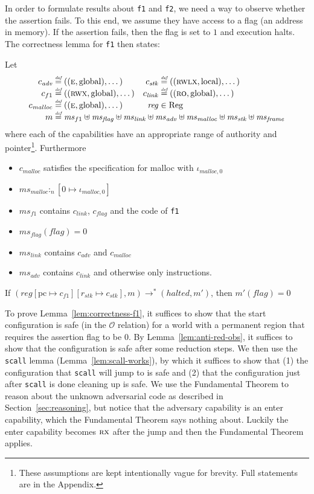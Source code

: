 \documentclass[format=acmsmall, review=true, screen=true]{acmart}
\renewcommand{\sectionname}{Section}
\newcommand{\update}[2]{[#1 \mapsto #2]}
\newcommand{\defeq}{\stackrel{\textit{\tiny{def}}}{=}}
\newcommand{\var}[1]{\mathit{#1}}
\newcommand{\hs}{\var{ms}}
\newcommand{\ms}{\hs}
\newcommand{\pcreg}{\mathrm{pc}}
\newcommand{\reg}{\var{reg}}
\newcommand{\heap}{\var{mem}}
\newcommand{\adv}{\var{adv}}
\newcommand{\link}{\var{link}}
\newcommand{\stk}{\var{stk}}
\newcommand{\flag}{\var{flag}}
\newcommand{\halted}{\mathit{halted}}
\newcommand{\heapSat}[3][\heap]{#1 :_{#2} #3}
\newcommand{\codelabel}[1]{\mathit{#1}}
\newcommand{\malloc}{\codelabel{malloc}}
\newcommand{\plaindom}[1]{\mathrm{#1}}
\newcommand{\Regs}{\plaindom{Reg}}
\newcommand{\observations}{\mathcal{O}}
\newcommand{\plainperm}[1]{\textsc{#1}}
\newcommand{\readonly}{\plainperm{ro}}
\newcommand{\exec}{\plainperm{rx}}
\newcommand{\entry}{\plainperm{e}}
\newcommand{\rwx}{\plainperm{rwx}}
\newcommand{\rwlx}{\plainperm{rwlx}}
\newcommand{\plainlocality}[1]{\mathrm{#1}}
\newcommand{\local}{\plainlocality{local}}
\newcommand{\glob}{\plainlocality{global}}
\newcommand{\step}[1][]{\rightarrow_{#1}}
\begin{document}
In order to formulate results about \texttt{f1} and
\texttt{f2}, we need a way to observe whether the assertion
fails. To this end, we assume they have access to a flag (an address in memory).
If the assertion fails, then the flag is set to $1$ and execution halts. The correctness lemma
for \texttt{f1} then states:
\begin{lemma}
  \label{lem:correctness-f1}
  Let
\[
    \begin{array}{r@{}lr@{}l}
    c_\adv & \;\defeq ((\entry,\glob),\dots) & c_{\var{stk}} & \;\defeq ((\rwlx,\local),\dots)\\
    c_{f1} & \;\defeq ((\rwx,\glob),\dots) & c_\link &\; \defeq ((\readonly,\glob),\dots)\\
    c_\malloc &\; \defeq ((\entry,\glob),\dots) & \reg& \; \in \Regs \\
    m &  \multicolumn{3}{@{}l}{\;\defeq \ms_{f1} \uplus \ms_\flag \uplus \ms_{\var{link}} \uplus \hs_\adv \uplus \ms_{\malloc} \uplus \ms_{\var{stk}} \uplus \ms_{\var{frame}}} \\
    \end{array}
\]
where each of the capabilities have an appropriate range of authority and
pointer\footnote{These assumptions are kept intentionally vague for brevity.
  Full statements are in the Appendix.}.
Furthermore
  \begin{itemize}
  \item $c_\malloc$ satisfies the specification for malloc with
    $\iota_{\malloc,0}$
  \item $\heapSat[\hs_{\malloc}]{n}{[0 \mapsto \iota_{\malloc,0}]}$
  \item $\ms_{f1}$ contains $c_\link$, $c_\flag$ and the code of \texttt{f1}
  \item $\ms_\flag(\flag) = 0$
  \item $\ms_{\var{link}}$ contains $c_\adv$ and $c_\malloc$
  \item $\hs_\adv$ contains $c_\link$ and otherwise only instructions.
  \end{itemize}
  If $(\reg\update{\pcreg}{c_{f1}}\update{r_\stk}{c_\stk},m) \step^* (\halted,m')$,
  then $m'(\flag) = 0$
\end{lemma}

To prove Lemma~\ref{lem:correctness-f1}, it suffices to show that the start
configuration is safe (in the $\observations$ relation) for a world with a
permanent region that requires the assertion flag to be 0. By
Lemma~\ref{lem:anti-red-obs}, it suffices to show that the configuration is safe
after some reduction steps. We then use the \texttt{scall} lemma
(Lemma~\ref{lem:scall-works}), by which it suffices to show that (1) the
configuration that \texttt{scall} will jump to is safe and (2)
that the configuration just after \texttt{scall} is done cleaning
up is safe. We use the Fundamental Theorem to reason about the unknown
adversarial code as described in \sectionname~\ref{sec:reasoning}, but notice
that the adversary capability is an enter capability, which the Fundamental
Theorem says nothing about. Luckily the enter capability becomes $\exec$ after
the jump and then the Fundamental Theorem applies.
\end{document}

